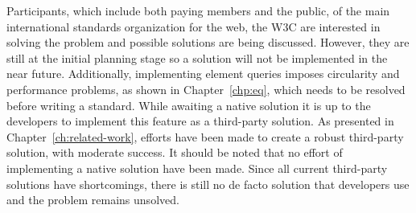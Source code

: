 \documentclass[a4paper,11pt]{kth-mag}
\begin{document}
      Participants, which include both paying members and the public, of the main international standards organization for the \gls{web}, the \gls{W3C} are interested in solving the problem and possible solutions are being discussed.
      However, they are still at the initial planning stage \cite{ricg_site} so a solution will not be implemented  in the near future.
      Additionally, implementing element queries imposes circularity and performance problems, as shown in Chapter~\ref{chp:eq}, which needs to be resolved before writing a standard.
      While awaiting a \gls{native} solution it is up to the developers to implement this feature as a \gls{third-party} solution.
      As presented in Chapter~\ref{ch:related-work}, efforts have been made to create a robust \gls{third-party} solution, with moderate success.
      It should be noted that no effort of implementing a native solution have been made.
      Since all current \gls{third-party} solutions have shortcomings, there is still no de facto solution that developers use and the problem remains unsolved.
\end{document}
